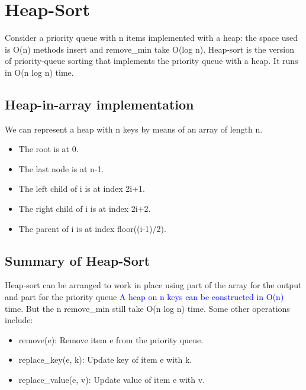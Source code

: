 \documentclass[12pt]{article}
\newcommand{\1}{\space \quad}
\newcommand{\2}{\quad \quad \quad}
\newcommand{\3}{\quad \quad \quad \quad \space}
\newcommand{\4}{\quad \quad \quad \quad \quad \quad}
\begin{document}
\newpage
\section{Heap-Sort}
Consider a priority queue with n items implemented with a heap: the space used is O(n) methods insert and remove\_min take O(log n).
Heap-sort is the version of priority-queue sorting that implements the priority queue with a heap. It runs in O(n log n) time.

\subsection{Heap-in-array implementation}
We can represent a heap with n keys by means of an array of length n.

\begin{itemize}
  \item The root is at $0$.
  \item The last node is at n-1.
  \item The left child of i is at index 2i+1.
  \item The right child of i is at index 2i+2.
  \item The parent of i is at index floor((i-1)/2).
\end{itemize}

\subsection{Summary of Heap-Sort}
Heap-sort can be arranged to work in place using part of the array for the output and part for the priority queue
\textcolor{blue}{A heap on n keys can be constructed in O(n)} time. But the n remove\_min still take O(n log n) time. Some other operations include:
\begin{itemize}
  \item remove(e): Remove item e from the priority queue.
  \item replace\_key(e, k): Update key of item e with k.
  \item replace\_value(e, v): Update value of item e with v.
\end{itemize}
\end{document}
